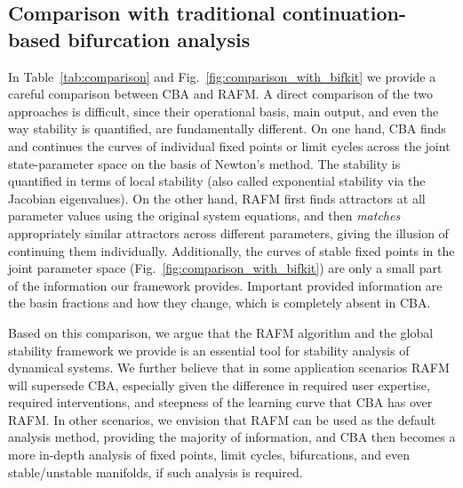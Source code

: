 \documentclass[%
 aip,
 amsmath,amssymb,
 reprint,%
]{revtex4-1}
\begin{document}
\subsection{Comparison with traditional continuation-based bifurcation analysis}
\label{sec:compare_linear}
In Table~\ref{tab:comparison} and Fig.~\ref{fig:comparison_with_bifkit} we provide a careful comparison between CBA and RAFM. A direct comparison of the two approaches is difficult, since their operational basis, main output, and even the way stability is quantified, are fundamentally different. On one hand, CBA finds and continues the curves of individual fixed points or limit cycles across the joint state-parameter space on the basis of Newton's method. The stability is quantified in terms of local stability (also called exponential stability via the Jacobian eigenvalues). On the other hand, RAFM first finds attractors at all parameter values using the original system equations, and then \emph{matches} appropriately similar attractors across different parameters, giving the illusion of continuing them individually. Additionally, the curves of stable fixed points in the joint parameter space (Fig.~\ref{fig:comparison_with_bifkit}) are only a small part of the information our framework provides. Important provided information are the basin fractions and how they change, which is completely absent in CBA. 

Based on this comparison, we argue that the RAFM algorithm and the global stability framework we provide is an essential tool for stability analysis of dynamical systems. We further believe that in some application scenarios RAFM will supersede CBA, especially given the difference in required user expertise, required interventions, and steepness of the learning curve that CBA has over RAFM. In other scenarios, we envision that RAFM can be used as the default analysis method, providing the majority of information, and CBA then becomes a more in-depth analysis of fixed points, limit cycles,  bifurcations, and even stable/unstable manifolds, if such analysis is required.

\end{document}
